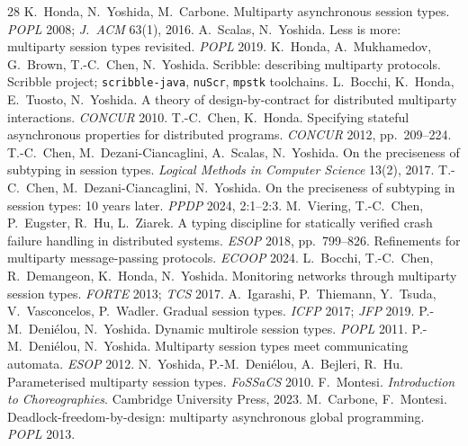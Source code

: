 \documentclass{article}
\begin{document}
\begin{thebibliography}{28}\small
{} K.~Honda, N.~Yoshida, M.~Carbone. Multiparty asynchronous session types. \emph{POPL} 2008; \emph{J.~ACM} 63(1), 2016.
 A.~Scalas, N.~Yoshida. Less is more: multiparty session types revisited. \emph{POPL} 2019.
 K.~Honda, A.~Mukhamedov, G.~Brown, T.-C.~Chen, N.~Yoshida. Scribble: describing multiparty protocols. Scribble project; \texttt{scribble-java}, \texttt{nuScr}, \texttt{mpstk} toolchains.
 L.~Bocchi, K.~Honda, E.~Tuosto, N.~Yoshida. A theory of design-by-contract for distributed multiparty interactions. \emph{CONCUR} 2010.
 T.-C.~Chen, K.~Honda. Specifying stateful asynchronous properties for distributed programs. \emph{CONCUR} 2012, pp.~209--224.
 T.-C.~Chen, M.~Dezani-Ciancaglini, A.~Scalas, N.~Yoshida. On the preciseness of subtyping in session types. \emph{Logical Methods in Computer Science} 13(2), 2017.
 T.-C.~Chen, M.~Dezani-Ciancaglini, N.~Yoshida. On the preciseness of subtyping in session types: 10 years later. \emph{PPDP} 2024, 2:1--2:3.
 M.~Viering, T.-C.~Chen, P.~Eugster, R.~Hu, L.~Ziarek. A typing discipline for statically verified crash failure handling in distributed systems. \emph{ESOP} 2018, pp.~799--826.
 Refinements for multiparty message-passing protocols. \emph{ECOOP} 2024.
 L.~Bocchi, T.-C.~Chen, R.~Demangeon, K.~Honda, N.~Yoshida. Monitoring networks through multiparty session types. \emph{FORTE} 2013; \emph{TCS} 2017.
 A.~Igarashi, P.~Thiemann, Y.~Tsuda, V.~Vasconcelos, P.~Wadler. Gradual session types. \emph{ICFP} 2017; \emph{JFP} 2019.
 P.-M.~Deni\'elou, N.~Yoshida. Dynamic multirole session types. \emph{POPL} 2011.
 P.-M.~Deni\'elou, N.~Yoshida. Multiparty session types meet communicating automata. \emph{ESOP} 2012.
 N.~Yoshida, P.-M.~Deni\'elou, A.~Bejleri, R.~Hu. Parameterised multiparty session types. \emph{FoSSaCS} 2010.
 F.~Montesi. \emph{Introduction to Choreographies}. Cambridge University Press, 2023.
 M.~Carbone, F.~Montesi. Deadlock-freedom-by-design: multiparty asynchronous global programming. \emph{POPL} 2013.

\end{thebibliography}
\end{document}
